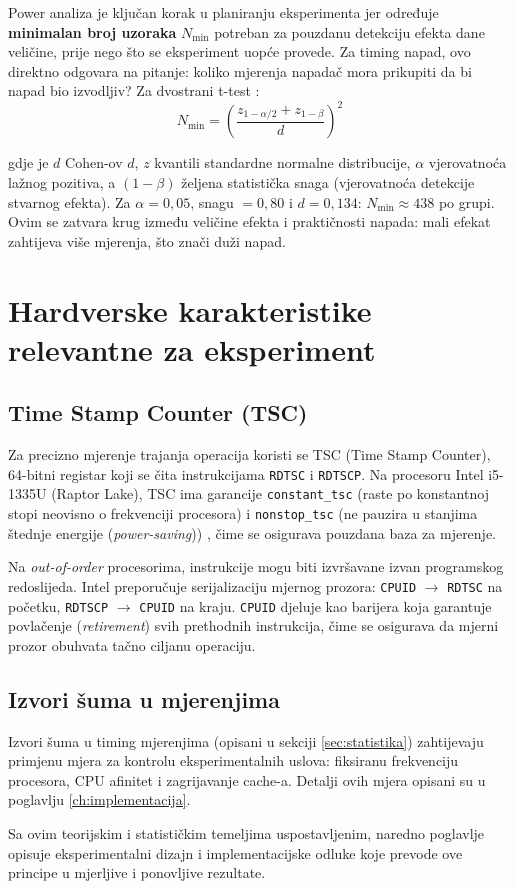 Power analiza je ključan korak u planiranju eksperimenta jer određuje \textbf{minimalan broj uzoraka} $N_{\min}$ potreban za pouzdanu detekciju efekta dane veličine, prije nego što se eksperiment uopće provede. Za timing napad, ovo direktno odgovara na pitanje: koliko mjerenja napadač mora prikupiti da bi napad bio izvodljiv? Za dvostrani t-test \cite{cohen1988}:
\begin{equation}
N_{\min} = \left(\frac{z_{1-\alpha/2} + z_{1-\beta}}{d}\right)^2
\label{eq:power}
\end{equation}

\noindent gdje je $d$ Cohen-ov $d$, $z$ kvantili standardne normalne distribucije, $\alpha$ vjerovatnoća lažnog pozitiva, a $(1-\beta)$ željena statistička snaga (vjerovatnoća detekcije stvarnog efekta). Za $\alpha = 0{,}05$, snagu $= 0{,}80$ i $d = 0{,}134$: $N_{\min} \approx 438$ po grupi. Ovim se zatvara krug između veličine efekta i praktičnosti napada: mali efekat zahtijeva više mjerenja, što znači duži napad.

\section{Hardverske karakteristike relevantne za eksperiment}

\subsection{Time Stamp Counter (TSC)}

Za precizno mjerenje trajanja operacija koristi se TSC (Time Stamp Counter), 64-bitni registar koji se čita instrukcijama \texttt{RDTSC} i \texttt{RDTSCP}. Na procesoru Intel i5-1335U (Raptor Lake), TSC ima garancije \texttt{constant\_tsc} (raste po konstantnoj stopi neovisno o frekvenciji procesora) i \texttt{nonstop\_tsc} (ne pauzira u stanjima štednje energije (\textit{power-saving})) \cite{intel_sdm}, čime se osigurava pouzdana baza za mjerenje.

Na \textit{out-of-order} procesorima, instrukcije mogu biti izvršavane izvan programskog redoslijeda. Intel preporučuje \cite{intel_bench} serijalizaciju mjernog prozora: \texttt{CPUID} $\to$ \texttt{RDTSC} na početku, \texttt{RDTSCP} $\to$ \texttt{CPUID} na kraju. \texttt{CPUID} djeluje kao barijera koja garantuje povlačenje (\textit{retirement}) svih prethodnih instrukcija, čime se osigurava da mjerni prozor obuhvata tačno ciljanu operaciju.

\subsection{Izvori šuma u mjerenjima}

Izvori šuma u timing mjerenjima (opisani u sekciji \ref{sec:statistika}) zahtijevaju primjenu mjera za kontrolu eksperimentalnih uslova: fiksiranu frekvenciju procesora, CPU afinitet i zagrijavanje cache-a. Detalji ovih mjera opisani su u poglavlju \ref{ch:implementacija}.

Sa ovim teorijskim i statističkim temeljima uspostavljenim, naredno poglavlje opisuje eksperimentalni dizajn i implementacijske odluke koje prevode ove principe u mjerljive i ponovljive rezultate.